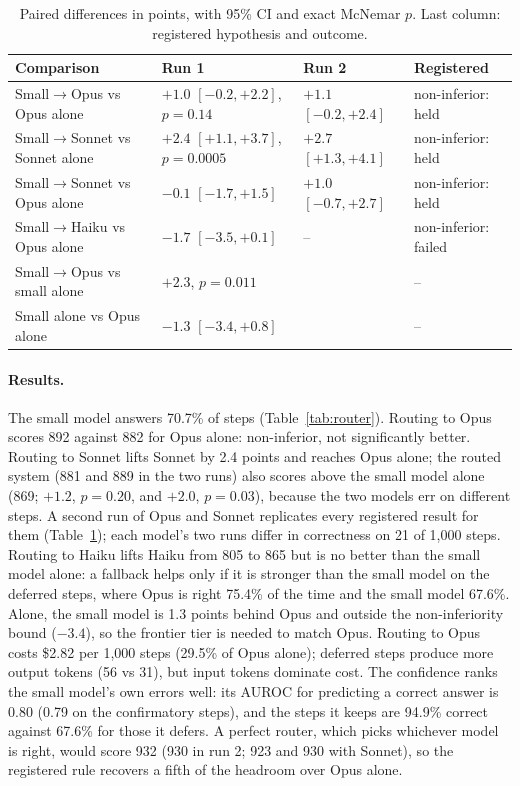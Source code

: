 \documentclass[10pt]{article}
\begin{document}
\begin{table}[t]\centering\small
\caption{Paired differences in points, with 95\% CI and exact McNemar $p$. Last column: registered hypothesis and outcome.}\label{tab:diffs}
\begin{tabular}{llll}\toprule
Comparison & Run 1 & Run 2 & Registered\\\midrule
Small$\rightarrow$Opus vs Opus alone & $+1.0$ $[-0.2,+2.2]$, $p{=}0.14$ & $+1.1$ $[-0.2,+2.4]$ & non-inferior: held\\
Small$\rightarrow$Sonnet vs Sonnet alone & $+2.4$ $[+1.1,+3.7]$, $p{=}0.0005$ & $+2.7$ $[+1.3,+4.1]$ & non-inferior: held\\
Small$\rightarrow$Sonnet vs Opus alone & $-0.1$ $[-1.7,+1.5]$ & $+1.0$ $[-0.7,+2.7]$ & non-inferior: held\\
Small$\rightarrow$Haiku vs Opus alone & $-1.7$ $[-3.5,+0.1]$ & -- & non-inferior: failed\\
Small$\rightarrow$Opus vs small alone & $+2.3$, $p{=}0.011$ & & --\\
Small alone vs Opus alone & $-1.3$ $[-3.4,+0.8]$ & & --\\\bottomrule
\end{tabular}\end{table}

\paragraph{Results.} The small model answers 70.7\% of steps (Table~\ref{tab:router}). Routing to Opus scores 892 against 882 for Opus alone: non-inferior, not significantly better. Routing to Sonnet lifts Sonnet by 2.4 points and reaches Opus alone; the routed system (881 and 889 in the two runs) also scores above the small model alone (869; $+1.2$, $p=0.20$, and $+2.0$, $p=0.03$), because the two models err on different steps. A second run of Opus and Sonnet replicates every registered result for them (Table~\ref{tab:diffs}); each model's two runs differ in correctness on 21 of 1{,}000 steps. Routing to Haiku lifts Haiku from 805 to 865 but is no better than the small model alone: a fallback helps only if it is stronger than the small model on the deferred steps, where Opus is right 75.4\% of the time and the small model 67.6\%. Alone, the small model is 1.3 points behind Opus and outside the non-inferiority bound ($-3.4$), so the frontier tier is needed to match Opus. Routing to Opus costs \$2.82 per 1{,}000 steps (29.5\% of Opus alone); deferred steps produce more output tokens (56 vs 31), but input tokens dominate cost. The confidence ranks the small model's own errors well: its AUROC for predicting a correct answer is 0.80 (0.79 on the confirmatory steps), and the steps it keeps are 94.9\% correct against 67.6\% for those it defers. A perfect router, which picks whichever model is right, would score 932 (930 in run 2; 923 and 930 with Sonnet), so the registered rule recovers a fifth of the headroom over Opus alone.
\end{document}
